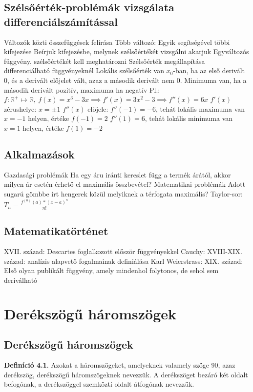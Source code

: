 \documentclass[twoside,12pt]{report}
\theoremstyle{definition}
\newtheorem{definition}[theorem]{Definíció}
\begin{document}
\section{Szélsőérték-problémák vizsgálata differenciálszámítással}
	\begin{outline}
		\1 Változók közti összefüggések felírása
			\2 Több változó: Egyik segítségével többi kifejezése
			\2 Beírjuk kifejezésbe, melynek szélsőértékét vizsgálni akarjuk
				\3[->] Egyváltozós függvény, szélsőértékét kell meghatározni
		\1 Szélsőérték megállapítása differenciálható függvényeknél
			\2 Lokális szélsőérték van $x_0$-ban, ha az első derivált 0, és a derivált előjelet vált, azaz a második derivált nem 0.
			\2 Minimuma van, ha a második derivált pozitív, maximuma ha negatív
			\2 Pl.: $f:\mathbb{R}^+\mapsto\mathbb{R},\ f(x)=x^3-3x\implies f'(x)=3x^2-3\implies f''(x)=6x$
				\3 $f'(x)$ zérushelye: $x=\pm1$
				\3 $f''(x)$ előjele: 
					\4 $f''(-1)=-6$, tehát lokális maximuma van $x=-1$ helyen, értéke $f(-1)=2$
					\4 $f''(1)=6$, tehát lokális minimuma van $x=1$ helyen, értéke $f(1)=-2$
	\end{outline}
\section{Alkalmazások}
	\begin{outline}
		\1 Gazdasági problémák
			\2 Ha egy áru iránti kereslet függ a termék árától, akkor milyen ár esetén érhető el maximális összbevétel?
		\1 Matematikai problémák
			\2 Adott sugarú gömbbe írt hengerek közül melyiknek a térfogata maximális?
		\1 Taylor-sor:
			\2 $T_n=\frac{f^{(n)}(a)*(x-a)^n}{n!}$
	\end{outline}
\section{Matematikatörténet}
	\begin{outline}
		\1 XVII. század: Descartes foglalkozott először függvényekkel
		\1 Cauchy: XVIII-XIX. század: analízis alapvető fogalmainak definiálása
		\1 Karl Weierstrass: XIX. század: Első olyan publikált függvény, amely mindenhol folytonos, de sehol sem deriválható
	\end{outline}
\chapter{Derékszögű háromszögek}
\section{Derékszögű háromszögek}
	\begin{definition}
		Azokat a háromszögeket, amelyeknek valamely szöge 90\degree, azaz derékszög, derékszögű
		háromszögeknek nevezzük. A derékszöget bezáró két oldalt befogónak, a derékszöggel szemközti oldalt átfogónak nevezzük.
	\end{definition}
\end{document}
